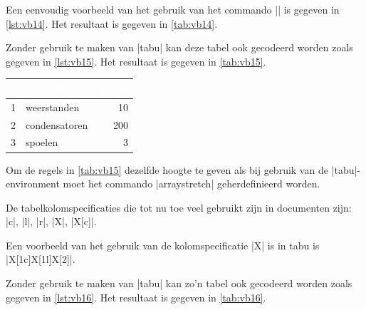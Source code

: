 \begin{llstShortInline}
	Een eenvoudig voorbeeld van het gebruik van het commando |\tabel| is gegeven in \cref{lst:vb14}.
	Het resultaat is gegeven in \cref{tab:vb14}.
	
	
	
	Zonder gebruik te maken van |tabu| kan deze tabel ook gecodeerd worden zoals gegeven in \cref{lst:vb15}. 
	Het resultaat is gegeven in \cref{tab:vb15}.
	
	\begin{myTable}[H]
		\renewcommand{\arraystretch}{1.24}%
		\centering%
		\caption{Eenvoudige tabel}
		\label{tab:vb15}
		\begin{tabular}{|clr|}
			\arrayrulecolor{hrred}\hline
			\rowcolor{hrred} 
			\multicolumn{1}{c}{\textcolor{white}{\textbf{\#}}} & \multicolumn{1}{c}{\textcolor{white}{\textbf{artikel}}} & \multicolumn{1}{c}{\textcolor{white}{\textbf{aantal}}} \\ \hline
			1 & weerstanden & 10 \\
			2 & condensatoren & 200 \\
			3 & spoelen & 3 \\ \hline
		\end{tabular}%
	\end{myTable}
	
	Om de regels in \cref{tab:vb15} dezelfde hoogte te geven als bij gebruik van de |tabu|-environment moet het commando |arraystretch| geherdefinieerd worden. 
	
	De tabelkolomspecificaties die tot nu toe veel gebruikt zijn in documenten zijn: |c|, |l|, |r|, |X|, |X[c]|.
	
	Een voorbeeld van het gebruik van de kolomspecificatie |X| is in tabu is |X[1c]X[1l]X[2]|.

	Zonder gebruik te maken van |tabu| kan zo'n tabel ook gecodeerd worden zoals gegeven in \cref{lst:vb16}. 
	Het resultaat is gegeven in \cref{tab:vb16}.
	

\end{llstShortInline}
